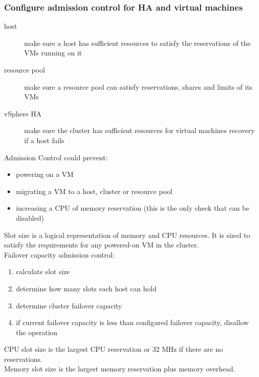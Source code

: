 \subsubsection{Configure admission control for HA and virtual machines}

\begin{description}

\item[host]
make sure a host has sufficient resources to satisfy the reservations of the
VMs running on it

\item[resource pool]
make sure a resource pool can satisfy reservations, shares and limits of its
VMs

\item[vSphere HA]
make sure the cluster has sufficient resources for virtual machines recovery
if a host fails

\end{description}

Admission Control could prevent:

\begin{itemize}
\item powering on a VM
\item migrating a VM to a host, cluster or resource pool
\item increasing a CPU of memory reservation (this is the only check that can
be disabled)
\end{itemize}

Slot size is a logical representation of memory and CPU resources. It is sized
to satisfy the requirements for any powered-on VM in the cluster.\\

Failover capacity admission control:

\begin{enumerate}
\item calculate slot size
\item determine how many slots each host can hold
\item determine cluster failover capacity
\item if current failover capacity is less than configured failover capacity,
disallow the operation
\end{enumerate}

CPU slot size is the largest CPU reservation or 32 MHz if there are no
reservations.\\

Memory slot size is the largest memory reservation plus memory overhead.\\

